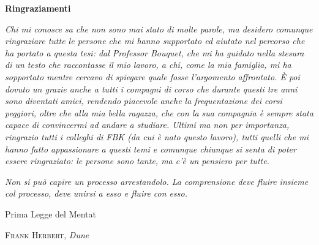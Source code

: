 \thispagestyle{empty}

\begin{center}
  {\bf \Huge Ringraziamenti}
\end{center}

\vspace{4cm}
\emph{
  Chi mi conosce sa che non sono mai stato di molte parole, 
  ma desidero comunque ringraziare tutte le persone che mi hanno supportato ed aiutato 
  nel percorso che ha portato a questa tesi: dal Professor Bouquet, che 
  mi ha guidato nella stesura di un testo che raccontasse il mio lavoro,
  a chi, come la mia famiglia, mi ha sopportato mentre cercavo di spiegare
  quale fosse l'argomento affrontato. 
  È poi dovuto un grazie anche a tutti i compagni di corso che durante questi
  tre anni sono diventati amici, rendendo piacevole anche la frequentazione
  dei corsi peggiori, oltre che alla mia bella ragazza, che con la sua compagnia 
  è sempre stata capace di convincermi ad andare a studiare.
  Ultimi ma non per importanza, ringrazio tutti i colleghi di FBK (da cui è nato questo lavoro),
  tutti quelli che mi hanno fatto appassionare a questi temi e comunque chiunque si senta di
  poter essere ringraziato: le persone sono tante, ma c'è un pensiero per tutte.
}


\vspace*{\fill}
\begin{flushright}
\begin{minipage}{0.58\textwidth}
  \raggedleft\itshape\small
  Non si può capire un processo arrestandolo.
  La comprensione deve fluire insieme col processo,
  deve unirsi a esso e fluire con esso.
  \par\vspace{0.9em}
  \upshape\footnotesize
  Prima Legge del Mentat\par
  \textsc{Frank Herbert}, \emph{Dune}\par
\end{minipage}
\end{flushright}
